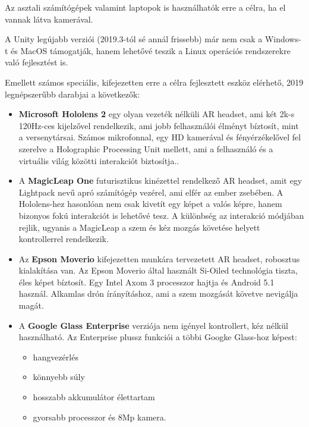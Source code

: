 Az asztali számítógépek valamint laptopok is használhatók erre a célra, ha el vannak látva kamerával.

A Unity legújabb verziói (2019.3-tól sé annál frissebb) már nem csak a Windows-t és MacOS támogatják, hanem  lehetővé teszik a Linux operációs rendszerekre való fejlesztést is.

Emellett számos speciális, kifejezetten erre a célra fejlesztett eszköz elérhető, 2019 legnépszerűbb darabjai a következők:
\begin{itemize}
\item {\bf Microsoft Hololens 2} egy olyan vezeték nélküli AR headset, ami két 2k-s 120Hz-ces kijelzővel rendelkezik, ami jobb felhasználói élményt bíztosít, mint a versenytársai. Számos mikrofonnal, egy HD kamerával és fényérzékelővel fel szerelve a Holographic Processing Unit mellett, ami a felhasználó és a virtuális világ közötti interakciót biztosítja..
\item A {\bf MagicLeap One} futurisztikus kinézettel rendelkező AR headset, amit egy Lightpack nevű apró számítógép vezérel, ami elfér az ember zsebében.  A Hololens-hez hasonlóan nem csak kivetít egy képet a valós képre, hanem bizonyos fokú interakciót is lehetővé tesz. A különbség az interakció módjában rejlik, ugyanis a MagicLeap a szem és kéz mozgás követése helyett kontrollerrel rendelkezik.
\item Az {\bf Epson Moverio} kifejezetten munkára tervezetett AR headset, robosztus kialakítása van. Az Epson Moverio által használt Si-Oiled technológia tiszta, éles képet bíztosít. Egy Intel Axom 3 processzor hajtja és Android 5.1 használ.  Alkamlas drón írányításhoz, ami a szem mozgását követve nevigálja magát.
\item A {\bf Google Glass Enterprise} verziója nem igényel kontrollert, kéz nélkül használható.
Az Enterprise plussz funkciói a többi Googke Glass-hoz képest:
\begin{itemize}
\item hangvezérlés
\item könnyebb súly
\item hosszabb akkumulátor élettartam
\item gyorsabb processzor és 8Mp kamera.
\end{itemize}
\end{itemize}

